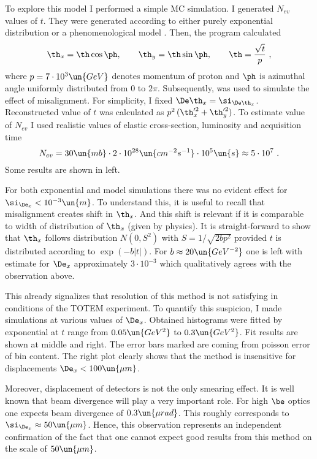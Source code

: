 To explore this model I performed a simple MC simulation. I generated $N_{ev}$ values of $t$. They were generated according to either purely exponential distribution or a phenomenological model . Then, the program calculated
$$\th_x = \th\cos\ph,\qquad\th_y = \th\sin\ph,\qquad\th = {\sqrt{t}\over p}\ ,$$
where $p = 7\cdot10^{3}\un{GeV}$ denotes momentum of proton and $\ph$ is azimuthal angle uniformly distributed from $0$ to $2\pi$. Subsequently,  was used to simulate the effect of misalignment. For simplicity, I fixed $\De\th_x = \si_{\De\th_x}$. Reconstructed value of $t$ was calculated as $p^2\, (\th_x'^2 + \th_y'^2)$. To estimate value of $N_{ev}$ I used realistic values of elastic cross-section, luminosity and acquisition time
$$N_{ev} = 30\un{mb} \cdot 2\cdot 10^{28} \un{cm^{-2} s^{-1}} \cdot 10^5\un{s} \approx 5\cdot10^{7}\ .$$
Some results are shown in  left.

For both exponential and model simulations there was no evident effect for $\si_{\De_x} < 10^{-3}\un{m}$. To understand this, it is useful to recall that misalignment creates shift in $\th_x$. And this shift is relevant if it is comparable to width of distribution of $\th_x$ (given by physics). It is straight-forward to show that $\th_x$ follows distribution $N(0, S^2)$ with $S = 1/\sqrt{2bp^2}$ provided $t$ is distributed according to $\exp(-b|t|)$. For $b\approx 20\un{GeV^{-2}}$ one is left with estimate for $\De_x$ approximately $3\cdot10^{-3}$ which qualitatively agrees with the observation above.

This already signalizes that resolution of this method is not satisfying in conditions of the TOTEM experiment. To quantify this suspicion, I made simulations at various values of $\De_x$. Obtained histograms were fitted by exponential at $t$ range from $0.05\un{GeV^2}$ to $0.3\un{GeV^2}$. Fit results are shown at  middle and right. The error bars marked are coming from poisson error of bin content. The right plot clearly shows that the method is insensitive for displacements $\De_x < 100\un{\mu m}$.

Moreover, displacement of detectors is not the only smearing effect. It is well known that beam divergence will play a very important role. For high $\be$ optics one expects beam divergence of $0.3\un{\mu rad}$. This roughly corresponds to $\si_{\De_x} \approx 50\un{\mu m}$. Hence, this observation represents an independent confirmation of the fact that one cannot expect good results from this method on the scale of $50\un{\mu m}$.

